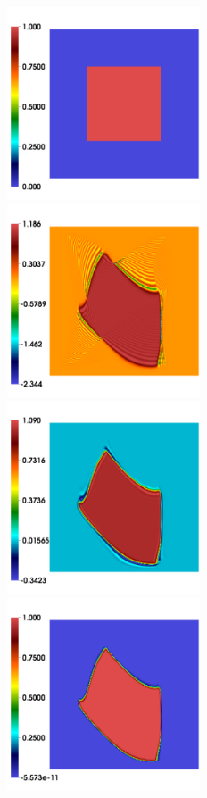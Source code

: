 \documentclass[final]{siamltex}
\begin{document}
\begin{figure}
\begin{center}
\includegraphics[width=2.25in]{square_init}
\includegraphics[width=2.25in]{square_cen}\\
\includegraphics[width=2.25in]{square_unl_b_bds}
\includegraphics[width=2.25in]{square_lim_b_bds}\\

\end{center}
\end{figure}
\end{document}

